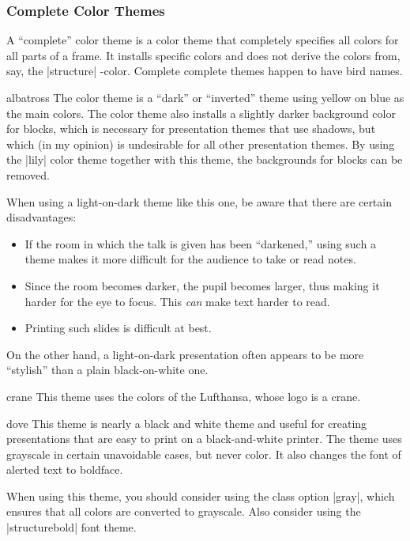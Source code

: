 \subsubsection{Complete Color Themes}

A ``complete'' color theme is a color theme that completely specifies
all colors for all parts of a frame. It installs specific colors and
does not derive the colors from, say, the |structure| \beamer-color.
Complete complete themes happen to have bird names.

\begin{colorthemeexample}{albatross}
  The color theme is a ``dark'' or ``inverted'' theme using yellow on
  blue as the main colors. The color theme also installs a slightly
  darker background color for blocks, which is necessary for
  presentation themes that use shadows, but which (in my opinion) is
  undesirable for all other presentation themes. By using the |lily|
  color theme together with this theme, the backgrounds for blocks can
  be removed.

  When using a light-on-dark theme like this one, be aware that there
  are certain disadvantages:
  \begin{itemize}
  \item
    If the room in which the talk is given has been ``darkened,''
    using such a theme makes it more difficult for the audience to
    take or read notes.
  \item
    Since the room becomes darker, the pupil becomes larger, thus
    making it harder for the eye to focus. This \emph{can} make text
    harder to  read.
  \item
    Printing such slides is difficult at best.
  \end{itemize}

  On the other hand, a light-on-dark presentation often appears to be
  more ``stylish''  than a plain black-on-white one.
\end{colorthemeexample}


\begin{colorthemeexample}{crane}
  This theme uses the colors of the Lufthansa, whose logo is a crane.
\end{colorthemeexample}



\begin{colorthemeexample}{dove}
  This theme is nearly a black and white theme and useful for creating
  presentations that are easy to print on a black-and-white
  printer. The theme uses grayscale in certain unavoidable cases, but
  never color. It also changes the font of alerted text to boldface.

  When using this theme, you should consider using the class option
  |gray|, which ensures that all colors are converted to
  grayscale. Also consider using the |structurebold| font theme.
\end{colorthemeexample}



